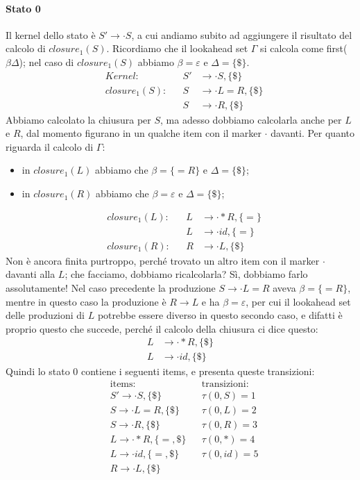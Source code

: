 \documentclass[class=book, crop=false, oneside, 12pt]{standalone}
\begin{document}
\paragraph{Stato 0}
Il kernel dello stato è \(S' \to \cdot S\), a cui andiamo subito ad aggiungere il risultato del calcolo di \(closure_1(S)\). Ricordiamo che il lookahead set \(\Gamma\) si calcola come first(\(\beta\Delta\)); nel caso di \(closure_1(S)\) abbiamo \(\beta = \varepsilon\) e \(\Delta = \{\$\}\).
\begin{align*}
    &&Kernel: &&S' &\to \cdot S, \{\$\}& \\
    &&closure_1(S): &&S &\to \cdot L = R, \{\$\} &\\
    && &&S &\to \cdot R, \{\$\} &
\end{align*}
Abbiamo calcolato la chiusura per \(S\), ma adesso  dobbiamo calcolarla anche per \(L\) e \(R\), dal momento figurano in un qualche item con il marker \(\cdot\) davanti. Per quanto riguarda il calcolo di \(\Gamma\):
\begin{itemize}
    \item in \(closure_1(L)\) abbiamo che \(\beta = \{=R\}\) e \(\Delta = \{\$\}\);
    \item in \(closure_1(R)\) abbiamo che \(\beta = \varepsilon\) e \(\Delta = \{\$\}\);
\end{itemize}
\begin{align*}
    &&closure_1(L): &&L &\to \cdot \ast R, \{=\} &\\
    && &&L &\to \cdot id, \{=\} &\\
    &&closure_1(R): &&R &\to \cdot L, \{\$\}&
\end{align*}
Non è ancora finita purtroppo, perché trovato un altro item con il marker \(\cdot\) davanti alla \(L\); che facciamo, dobbiamo ricalcolarla? Sì, dobbiamo farlo assolutamente! Nel caso precedente la produzione \(S \to \cdot L = R\) aveva \(\beta = \{=R\}\), mentre in questo caso la produzione è \(R \to L\) e ha \(\beta = \varepsilon\), per cui il lookahead set delle produzioni di \(L\) potrebbe essere diverso in questo secondo caso, e difatti è proprio questo che succede, perché il calcolo della chiusura ci dice questo:
\begin{align*}
    L &\to \cdot \ast R, \{\$\} \\
    L &\to \cdot id, \{\$\}
\end{align*}
Quindi lo stato 0 contiene i seguenti items, e presenta queste transizioni:
\begin{align*}
    &\textrm{items:} & &\textrm{transizioni:} \\
    &S' \to \cdot S, \{\$\}  & &\tau(0, S) = 1 \\
    &S \to \cdot L = R, \{\$\}  & &\tau(0, L) = 2 \\
    &S \to \cdot R, \{\$\}  & &\tau(0, R) = 3 \\
    &L \to \cdot \ast R, \{=, \$\}  & &\tau(0, \ast) = 4 \\
    &L \to \cdot id, \{=, \$\}  & &\tau(0, id) = 5 \\
    &R \to \cdot L, \{\$\}  & &
\end{align*}
\end{document}
